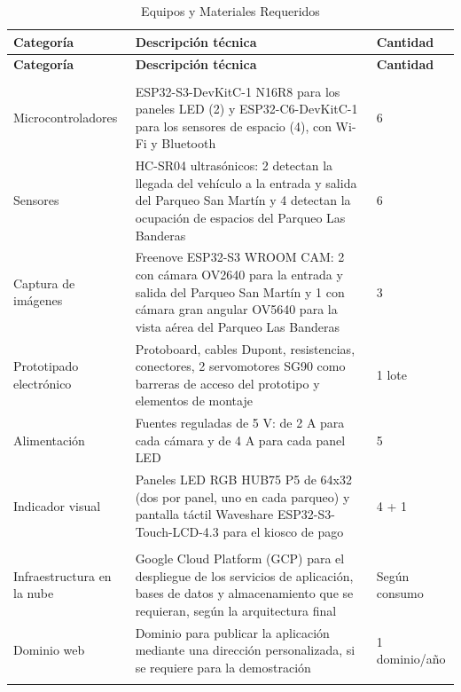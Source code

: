\documentclass[12pt,a4paper]{article}
\begin{document}
\begingroup
\small
\begin{longtable}{@{} p{} p{} p{} @{}}
	\caption{Equipos y Materiales Requeridos} \label{tab:recursos_requeridos} \\
	\toprule
	\textbf{Categoría} & \textbf{Descripción técnica} & \textbf{Cantidad} \\
	\midrule
	\endfirsthead
	
	\toprule
	\textbf{Categoría} & \textbf{Descripción técnica} & \textbf{Cantidad} \\
	\midrule
	\endhead
	
	\bottomrule
	\endlastfoot
	
	\multicolumn{3}{l}{\textbf{Hardware IoT}} \\
	\midrule
	Microcontroladores &
	ESP32-S3-DevKitC-1 N16R8 para los paneles LED (2) y ESP32-C6-DevKitC-1 para los sensores de espacio (4), con Wi-Fi y Bluetooth &
	6 \\
	
	Sensores &
	HC-SR04 ultrasónicos: 2 detectan la llegada del vehículo a la entrada y salida del Parqueo San Martín y 4 detectan la ocupación de espacios del Parqueo Las Banderas &
	6 \\
	
	Captura de imágenes &
	Freenove ESP32-S3 WROOM CAM: 2 con cámara OV2640 para la entrada y salida del Parqueo San Martín y 1 con cámara gran angular OV5640 para la vista aérea del Parqueo Las Banderas &
	3 \\
	
	Prototipado electrónico &
	Protoboard, cables Dupont, resistencias, conectores, 2 servomotores SG90 como barreras de acceso del prototipo y elementos de montaje &
	1 lote \\
	
	Alimentación &
	Fuentes reguladas de 5 V: de 2 A para cada cámara y de 4 A para cada panel LED &
	5 \\
	
	Indicador visual &
	Paneles LED RGB HUB75 P5 de 64x32 (dos por panel, uno en cada parqueo) y pantalla táctil Waveshare ESP32-S3-Touch-LCD-4.3 para el kiosco de pago &
	4 + 1 \\
	\addlinespace
	
	\midrule
	\multicolumn{3}{l}{\textbf{Servicios Cloud}} \\
	\midrule
	Infraestructura en la nube &
	Google Cloud Platform (GCP) para el despliegue de los servicios de aplicación, bases de datos y almacenamiento que se requieran, según la arquitectura final &
	Según consumo \\
	
	Dominio web &
	Dominio para publicar la aplicación mediante una dirección personalizada, si se requiere para la demostración &
	1 dominio/año \\
	\addlinespace
\end{longtable}
\endgroup
\end{document}
